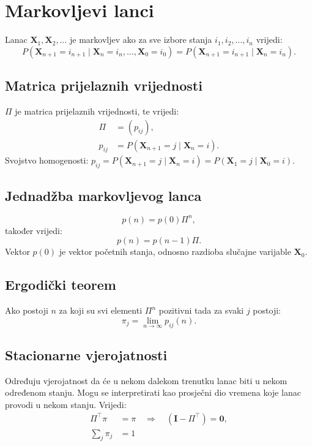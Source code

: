 \documentclass[12pt,english]{article}
\begin{document}
\section{Markovljevi lanci}
Lanac $\mathbf X_1, \mathbf X_2, \ldots$ je markovljev ako za sve izbore stanja $i_1, i_2, \ldots, i_n$ vrijedi:
$$P\left(\mathbf X_{n+1} = i_{n+1} \;|\; \mathbf X_n = i_n, \ldots, \mathbf X_0 = i_0\right) = P\left(\mathbf X_{n+1} = i_{n+1} \;|\; \mathbf X_n = i_n\right).$$

\subsection{Matrica prijelaznih vrijednosti}
$\Pi$ je matrica prijelaznih vrijednosti, te vrijedi:
\begin{align*}
\Pi &= (p_{ij}),\\
p_{ij} &= P\left(\mathbf X_{n+1} = j \;|\; \mathbf X_n = i\right).
\end{align*}
Svojstvo homogenosti: $p_{ij}  = P(\mathbf X_{n+1} = j \;|\; \mathbf X_n = i)= P(\mathbf X_1 = j \;|\; \mathbf X_0 = i)$.

\subsection{Jednadžba markovljevog lanca}
$$p(n) = p(0)\Pi^n,$$
također vrijedi:
$$p(n) = p(n-1)\Pi.$$
Vektor $p(0)$ je vektor početnih stanja, odnosno razdioba slučajne varijable $\mathbf X_0$.

\subsection{Ergodički teorem}
Ako postoji $n$ za koji su svi elementi $\Pi^n$ pozitivni tada za svaki $j$ postoji:
$$\pi_j = \lim_{n \rightarrow \infty} p_{ij}(n).$$

\subsection{Stacionarne vjerojatnosti}
Određuju vjerojatnost da će u nekom dalekom trenutku lanac biti u nekom određenom stanju. Mogu se interpretirati kao prosječni dio vremena koje lanac provodi u nekom stanju. Vrijedi:
\begin{align*}
\Pi^\top\pi &= \pi \quad \Rightarrow \quad \left( \mathbf I - \Pi^\top \right) = \mathbf 0,\\
\sum_j \pi_j &= 1
\end{align*}
\end{document}
